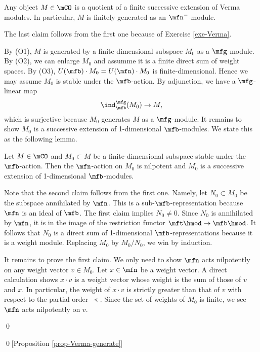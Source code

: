 \begin{prop} \label{prop-Verma-generate}
	Any object $M\in \mCO$ is a quotient of a finite successive extension of Verma modules. In particular, $M$ is finitely generated as an $\mfn^-$-module.
\end{prop}

\proof
	The last claim follows from the first one because of Exercise \ref{exe-Verma}.

	By (O1), $M$ is generated by a finite-dimensional subspace $M_0$ as a $\mfg$-module. By (O2), we can enlarge $M_0$ and assumme it is a finite direct sum of weight spaces. By (O3), $U(\mfb)\cdot M_0 = U(\mfn)\cdot M_0$ is finite-dimensional. Hence we may assume $M_0$ is stable under the $\mfb$-action. By adjunction, we have a $\mfg$-linear map
	\[
		\ind_\mfb^\mfg( M_0 ) \to M,
	\]
	which is surjective because $M_0$ generates $M$ as a $\mfg$-module. It remains to show $M_0$ is a successive extension of 1-dimensional $\mfb$-modules. We state this as the following lemma.

\begin{lem}
	Let $M\in \mCO$ and $M_0\subset M$ be a finite-dimensional subspace stable under the $\mfb$-action. Then the $\mfn$-action on $M_0$ is nilpotent and $M_0$ is a successive extension of 1-dimensional $\mfb$-modules.
\end{lem}

\proof
	Note that the second claim follows from the first one. Namely, let $N_0\subset M_0$ be the subspace annihilated by $\mfn$. This is a sub-$\mfb$-representation because $\mfn$ is an ideal of $\mfb$. The first claim implies $N_0\neq 0$. Since $N_0$ is annihilated by $\mfn$, it is in the image of the restriction functor $\mft\hmod \to \mfb\hmod$. It follows that $N_0$ is a direct sum of 1-dimensional $\mfb$-representations because it is a weight module. Replacing $M_0$ by $M_0/N_0$, we win by induction.

	It remains to prove the first claim. We only need to show $\mfn$ acts nilpotently on any weight vector $v\in M_0$. Let $x\in \mfn$ be a weight vector. A direct calculation shows $x\cdot v$ is a weight vector whose weight is the sum of those of $v$ and $x$. In particular, the weight of $x\cdot v$ is strictly greater than that of $v$ with respect to the partial order $\prec$. Since the set of weights of $M_0$ is finite, we see $\mfn$ acts nilpotently on $v$.

\qed

\qed[Proposition \ref{prop-Verma-generate}]


